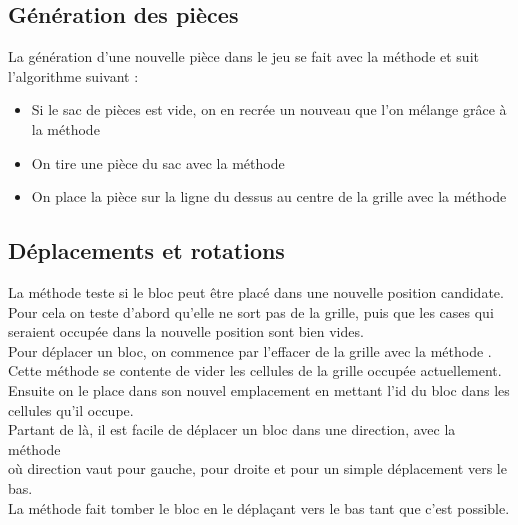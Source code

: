 \subsection{Génération des pièces}
La génération d'une nouvelle pièce dans le jeu se fait avec la méthode  et suit l'algorithme suivant :
\begin{itemize}
	\item Si le sac de pièces est vide, on en recrée un nouveau que l'on mélange grâce à la méthode 
	\item On tire une pièce du sac avec la méthode 
	\item On place la pièce sur la ligne du dessus au centre de la grille avec la méthode\\ 
\end{itemize}


\subsection{Déplacements et rotations}
La méthode  teste si le bloc peut être placé dans une nouvelle position candidate.\\
Pour cela on teste d'abord qu'elle ne sort pas de la grille, puis que les cases qui seraient occupée dans la nouvelle position sont bien vides.\\

Pour déplacer un bloc, on commence par l'effacer de la grille avec la méthode . Cette méthode se contente de vider les cellules de la grille occupée actuellement.\\
Ensuite on le place dans son nouvel emplacement en mettant l'id du bloc dans les cellules qu'il occupe. \\

Partant de là, il est facile de déplacer un bloc dans une direction, avec la méthode\\  où direction vaut  pour gauche,  pour droite et  pour un simple déplacement vers le bas.\\
La méthode  fait tomber le bloc en le déplaçant vers le bas tant que c'est possible.\\

